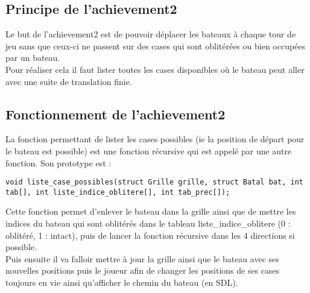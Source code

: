 \subsection{Principe de l'achievement2}
Le but de l'achievement2 est de pouvoir déplacer les bateaux à chaque tour de jeu sans que ceux-ci ne passent sur des cases qui sont oblitérées ou bien occupées par un bateau. \\
Pour réaliser cela il faut lister toutes les cases disponibles où le bateau peut aller avec une suite de translation finie.

\subsection{Fonctionnement de l'achievement2}
La fonction permettant de lister les cases possibles (ie la position de départ pour le bateau est possible) est une fonction récursive qui est appelé par une autre fonction. Son prototype est : 
\begin{lstlisting}
void liste_case_possibles(struct Grille grille, struct Batal bat, int tab[], int liste_indice_oblitere[], int tab_prec[]);
\end{lstlisting}
Cette fonction permet d'enlever le bateau dans la grille ainsi que de mettre les indices du bateau qui sont oblitérés dans le tableau liste\_indice\_oblitere (0 : oblitéré, 1 : intact), puis de lancer la fonction récursive dans les 4 directions si possible.\\
Puis ensuite il va falloir mettre à jour la grille ainsi que le bateau avec ses nouvelles positions puis le joueur afin de changer les positions de ses cases toujours en vie ainsi qu'afficher le chemin du bateau (en SDL).

